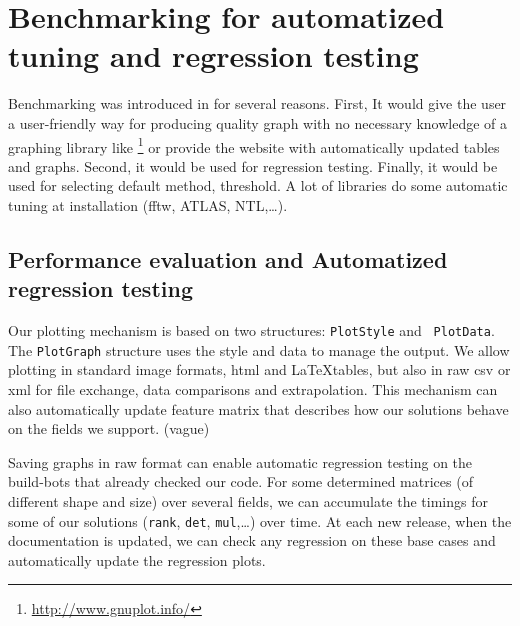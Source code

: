 \section{Benchmarking  for automatized tuning and regression testing}\label{sec:bench}
%
Benchmarking was introduced in \linbox for several reasons. First, It would
give the user a user-friendly way for producing quality graph with no necessary
knowledge of a graphing library like \gnuplot%
%
%
\footnote{\url{http://www.gnuplot.info/}}
%
or provide the \linbox website with automatically updated tables and graphs.
Second, it would be used for regression testing.  Finally, it would be used for
selecting default method, threshold. A lot of libraries do some automatic tuning
at installation (\textsf{fftw}, \textsf{ATLAS}, \textsf{NTL},\ldots).
%
\par
%
%
%
\subsection{Performance evaluation and Automatized regression testing}
%
Our plotting mechanism is based on two structures: {\tt PlotStyle} and {\tt
PlotData}. The  {\tt PlotGraph} structure uses the style and data to manage the
output.  We allow plotting in standard image formats, html and \LaTeX tables,
but also in raw csv or xml for file exchange, data comparisons and
extrapolation. This mechanism can also automatically update \linbox feature
matrix that describes how our solutions behave on the fields we support. (vague)
%
\par
%
% 
%
%
%
Saving graphs in raw format can enable automatic regression testing on the
build-bots that already checked our code. For some determined matrices (of
different shape and size) over several fields, we can accumulate the timings
for some of our solutions ({\tt rank}, {\tt det}, {\tt mul},\ldots) over time.
At each new release, when the documentation is updated, we can check any
regression on these base cases and automatically update the regression plots.
%
